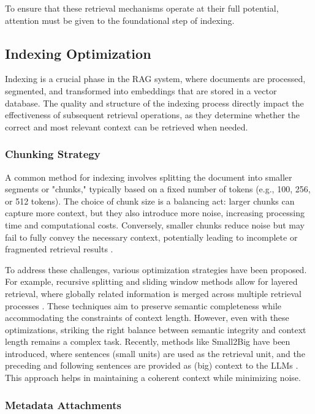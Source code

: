 To ensure that these retrieval mechanisms operate at their full potential, attention must be given to the foundational step of indexing.

\subsection{Indexing Optimization}

Indexing is a crucial phase in the RAG system, where documents are processed, segmented, and transformed into embeddings that are stored in a vector database. The quality and structure of the indexing process directly impact the effectiveness of subsequent retrieval operations, as they determine whether the correct and most relevant context can be retrieved when needed.

\subsubsection{Chunking Strategy}

A common method for indexing involves splitting the document into smaller segments or "chunks," typically based on a fixed number of tokens (e.g., 100, 256, or 512 tokens). The choice of chunk size is a balancing act: larger chunks can capture more context, but they also introduce more noise, increasing processing time and computational costs. Conversely, smaller chunks reduce noise but may fail to fully convey the necessary context, potentially leading to incomplete or fragmented retrieval results \cite{teja2023chunk}.

To address these challenges, various optimization strategies have been proposed. For example, recursive splitting and sliding window methods allow for layered retrieval, where globally related information is merged across multiple retrieval processes \cite{langchain2023recursive}. These techniques aim to preserve semantic completeness while accommodating the constraints of context length. However, even with these optimizations, striking the right balance between semantic integrity and context length remains a complex task. Recently, methods like Small2Big have been introduced, where sentences (small units) are used as the retrieval unit, and the preceding and following sentences are provided as (big) context to the LLMs \cite{yang2023smalltobig}. This approach helps in maintaining a coherent context while minimizing noise.

\subsubsection{Metadata Attachments}

